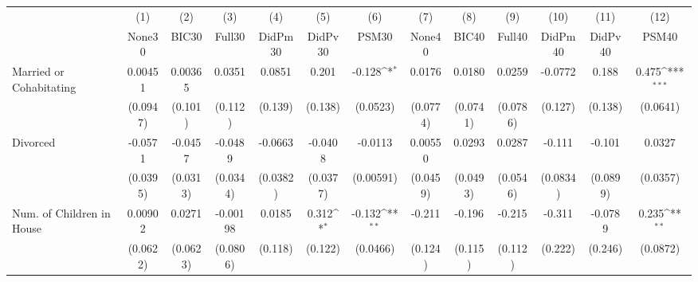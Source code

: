{
\def\sym#1{\ifmmode^{#1}\else\(^{#1}\)\fi}
\begin{tabular}{l*{12}{c}}
\toprule
            &\multicolumn{1}{c}{(1)}&\multicolumn{1}{c}{(2)}&\multicolumn{1}{c}{(3)}&\multicolumn{1}{c}{(4)}&\multicolumn{1}{c}{(5)}&\multicolumn{1}{c}{(6)}&\multicolumn{1}{c}{(7)}&\multicolumn{1}{c}{(8)}&\multicolumn{1}{c}{(9)}&\multicolumn{1}{c}{(10)}&\multicolumn{1}{c}{(11)}&\multicolumn{1}{c}{(12)}\\
            &\multicolumn{1}{c}{None30}&\multicolumn{1}{c}{BIC30}&\multicolumn{1}{c}{Full30}&\multicolumn{1}{c}{DidPm30}&\multicolumn{1}{c}{DidPv30}&\multicolumn{1}{c}{PSM30}&\multicolumn{1}{c}{None40}&\multicolumn{1}{c}{BIC40}&\multicolumn{1}{c}{Full40}&\multicolumn{1}{c}{DidPm40}&\multicolumn{1}{c}{DidPv40}&\multicolumn{1}{c}{PSM40}\\
\midrule
Married or Cohabitating&     0.00451         &     0.00365         &      0.0351         &      0.0851         &       0.201         &      -0.128\sym{*}  &      0.0176         &      0.0180         &      0.0259         &     -0.0772         &       0.188         &       0.475\sym{***}\\
            &    (0.0947)         &     (0.101)         &     (0.112)         &     (0.139)         &     (0.138)         &    (0.0523)         &    (0.0774)         &    (0.0741)         &    (0.0786)         &     (0.127)         &     (0.138)         &    (0.0641)         \\
\addlinespace
Divorced    &     -0.0571         &     -0.0457         &     -0.0489         &     -0.0663         &     -0.0408         &     -0.0113         &     0.00550         &      0.0293         &      0.0287         &      -0.111         &      -0.101         &      0.0327         \\
            &    (0.0395)         &    (0.0313)         &    (0.0344)         &    (0.0382)         &    (0.0377)         &   (0.00591)         &    (0.0459)         &    (0.0493)         &    (0.0546)         &    (0.0834)         &    (0.0899)         &    (0.0357)         \\
\addlinespace
Num. of Children in House&     0.00902         &      0.0271         &    -0.00198         &      0.0185         &       0.312\sym{*}  &      -0.132\sym{**} &      -0.211         &      -0.196         &      -0.215         &      -0.311         &     -0.0789         &       0.235\sym{**} \\
            &    (0.0622)         &    (0.0623)         &    (0.0806)         &     (0.118)         &     (0.122)         &    (0.0466)         &     (0.124)         &     (0.115)         &     (0.112)         &     (0.222)         &     (0.246)         &    (0.0872)         \\

\end{tabular}}

